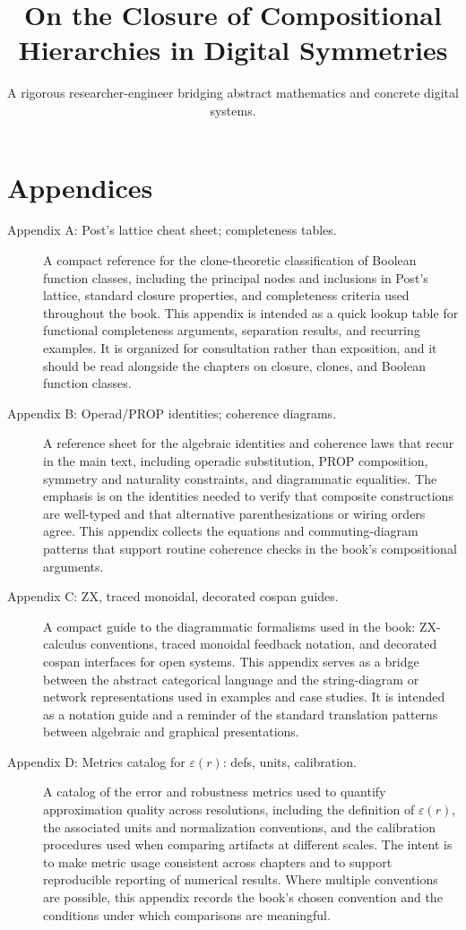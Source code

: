 \documentclass[11pt]{article}
\title{On the Closure of Compositional Hierarchies in Digital Symmetries}
\author{A rigorous researcher-engineer bridging abstract mathematics and concrete digital systems.}
\begin{document}
\section*{Appendices}

\begin{description}
  \item[Appendix A: Post's lattice cheat sheet; completeness tables.] A compact reference for the clone-theoretic classification of Boolean function classes, including the principal nodes and inclusions in Post's lattice, standard closure properties, and completeness criteria used throughout the book. This appendix is intended as a quick lookup table for functional completeness arguments, separation results, and recurring examples. It is organized for consultation rather than exposition, and it should be read alongside the chapters on closure, clones, and Boolean function classes.

  \item[Appendix B: Operad/PROP identities; coherence diagrams.] A reference sheet for the algebraic identities and coherence laws that recur in the main text, including operadic substitution, PROP composition, symmetry and naturality constraints, and diagrammatic equalities. The emphasis is on the identities needed to verify that composite constructions are well-typed and that alternative parenthesizations or wiring orders agree. This appendix collects the equations and commuting-diagram patterns that support routine coherence checks in the book's compositional arguments.

  \item[Appendix C: ZX, traced monoidal, decorated cospan guides.] A compact guide to the diagrammatic formalisms used in the book: ZX-calculus conventions, traced monoidal feedback notation, and decorated cospan interfaces for open systems. This appendix serves as a bridge between the abstract categorical language and the string-diagram or network representations used in examples and case studies. It is intended as a notation guide and a reminder of the standard translation patterns between algebraic and graphical presentations.

  \item[Appendix D: Metrics catalog for \(\varepsilon(r)\): defs, units, calibration.] A catalog of the error and robustness metrics used to quantify approximation quality across resolutions, including the definition of \(\varepsilon(r)\), the associated units and normalization conventions, and the calibration procedures used when comparing artifacts at different scales. The intent is to make metric usage consistent across chapters and to support reproducible reporting of numerical results. Where multiple conventions are possible, this appendix records the book's chosen convention and the conditions under which comparisons are meaningful.
\end{description}
\end{document}
